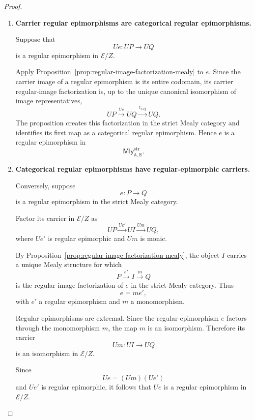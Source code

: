 \begin{proof}
    \leavevmode
    \begin{enumerate}
        \item \textbf{Carrier regular epimorphisms are categorical regular
        epimorphisms.}

        Suppose that
        \[
            Ue:UP\to UQ
        \]
        is a regular epimorphism in \(\mathcal E/Z\).

        Apply
        Proposition~\ref{prop:regular-image-factorization-mealy} to \(e\).
        Since the carrier image of a regular epimorphism is its entire
        codomain, its carrier regular-image factorization is, up to the unique
        canonical isomorphism of image representatives,
        \[
            UP\xrightarrow{Ue}UQ\xrightarrow{1_{UQ}}UQ.
        \]
        The proposition creates this factorization in the strict Mealy
        category and identifies its first map as a categorical regular
        epimorphism. Hence \(e\) is a regular epimorphism in
        \[
            \mathsf{Mly}^{\mathrm{str}}_{\mathbb A,\mathbb B}.
        \]

        \item \textbf{Categorical regular epimorphisms have regular-epimorphic
        carriers.}

        Conversely, suppose
        \[
            e:P\to Q
        \]
        is a regular epimorphism in the strict Mealy category.

        Factor its carrier in \(\mathcal E/Z\) as
        \[
            UP
            \xrightarrow{Ue'}
            UI
            \xrightarrow{Um}
            UQ,
        \]
        where \(Ue'\) is regular epimorphic and \(Um\) is monic.

        By
        Proposition~\ref{prop:regular-image-factorization-mealy}, the object
        \(I\) carries a unique Mealy structure for which
        \[
            P\xrightarrow{e'}I\xrightarrow{m}Q
        \]
        is the regular image factorization of \(e\) in the strict Mealy
        category. Thus
        \[
            e=me',
        \]
        with \(e'\) a regular epimorphism and \(m\) a monomorphism.

        Regular epimorphisms are extremal. Since the regular epimorphism \(e\)
        factors through the monomorphism \(m\), the map \(m\) is an
        isomorphism. Therefore its carrier
        \[
            Um:UI\to UQ
        \]
        is an isomorphism in \(\mathcal E/Z\).

        Since
        \[
            Ue=(Um)(Ue')
        \]
        and \(Ue'\) is regular epimorphic, it follows that \(Ue\) is a regular
        epimorphism in \(\mathcal E/Z\).
    \end{enumerate}
\end{proof}

